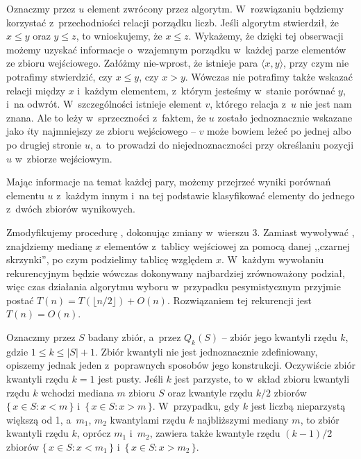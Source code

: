Oznaczmy przez $u$ element zwrócony przez algorytm.
W~rozwiązaniu będziemy korzystać z~przechodniości relacji porządku liczb.
Jeśli algorytm stwierdził, że $x\le y$ oraz $y\le z$, to wnioskujemy, że $x\le z$.
Wykażemy, że dzięki tej obserwacji możemy uzyskać informacje o~wzajemnym porządku w~każdej parze elementów ze zbioru wejściowego.
Załóżmy nie-wprost, że istnieje para $\langle x,y\rangle$, przy czym nie potrafimy stwierdzić, czy $x\le y$, czy $x>y$.
Wówczas nie potrafimy także wskazać relacji między $x$ i~każdym elementem, z~którym jesteśmy w~stanie porównać $y$, i~na odwrót.
W~szczególności istnieje element $v$, którego relacja z~$u$ nie jest nam znana.
Ale to leży w~sprzeczności z~faktem, że $u$ zostało jednoznacznie wskazane jako $i$\nbhyphen ty najmniejszy ze zbioru wejściowego -- $v$ może bowiem leżeć po jednej albo po drugiej stronie $u$, a~to prowadzi do niejednoznaczności przy określaniu pozycji $u$ w~zbiorze wejściowym.

Mając informacje na temat każdej pary, możemy przejrzeć wyniki porównań elementu $u$ z~każdym innym i~na tej podstawie klasyfikować elementy do jednego z~dwóch zbiorów wynikowych.

\exercise %
Zmodyfikujemy procedurę , dokonując zmiany w~wierszu 3.
Zamiast wywoływać , znajdziemy medianę $x$ elementów z~tablicy wejściowej za pomocą danej ,,czarnej skrzynki'', po czym podzielimy tablicę względem $x$.
W~każdym wywołaniu rekurencyjnym będzie wówczas dokonywany najbardziej zrównoważony podział, więc czas działania algorytmu wyboru w~przypadku pesymistycznym przyjmie postać $T(n)=T(\lfloor n/2\rfloor)+O(n)$.
Rozwiązaniem tej rekurencji jest $T(n)=O(n)$.

\exercise %
Oznaczmy przez $S$ badany zbiór, a~przez $Q_k(S)$ -- zbiór jego kwantyli rzędu $k$, gdzie $1\le k\le|S|+1$.
Zbiór kwantyli nie jest jednoznacznie zdefiniowany, opiszemy jednak jeden z~poprawnych sposobów jego konstrukcji.
Oczywiście zbiór kwantyli rzędu $k=1$ jest pusty.
Jeśli $k$ jest parzyste, to w~skład zbioru kwantyli rzędu $k$ wchodzi mediana $m$ zbioru $S$ oraz kwantyle rzędu $k/2$ zbiorów $\{\,x\in S:x<m\,\}$ i~$\{\,x\in S:x>m\,\}$.
W~przypadku, gdy $k$ jest liczbą nieparzystą większą od 1, a~$m_1$, $m_2$ kwantylami rzędu $k$ najbliższymi mediany $m$, to zbiór kwantyli rzędu $k$, oprócz $m_1$ i~$m_2$, zawiera także kwantyle rzędu $(k-1)/2$ zbiorów $\{\,x\in S:x<m_1\,\}$ i~$\{\,x\in S:x>m_2\,\}$.

